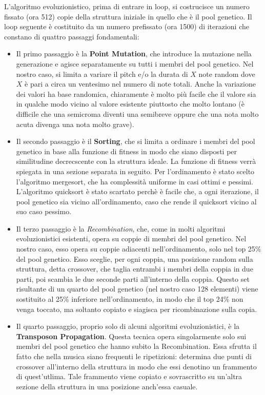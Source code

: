 L'algoritmo evoluzionistico, prima di entrare in loop, si costrucisce un numero fissato (ora 512) copie della struttura iniziale in quello che è il pool genetico.
Il loop seguente è costituito da un numero prefissato (ora 1500) di iterazioni che constano di quattro passaggi fondamentali\cite{yt:evol}:
\begin{itemize}
 \item Il primo passaggio è la \textbf{Point Mutation}, che introduce la mutazione nella generazione e agisce separatamente su tutti i membri del pool genetico.
 Nel nostro caso, si limita a variare il pitch e/o la durata di $X$ note random dove $X$ è pari a circa un ventesimo nel numero di note totali.
 Anche la variazione dei valori ha base randomica, chiaramente è molto più facile che il valore sia in qualche modo vicino al valore esistente piuttosto che molto lontano (è difficile che una semicroma diventi una semibreve oppure che una nota molto acuta divenga una nota molto grave).
 \item Il secondo passaggio è il \textbf{Sorting}, che si limita a ordinare i membri del pool genetico in base alla funzione di fitness in modo che siano disposti per similitudine decrecscente con la struttura ideale.
 La funzione di fitness verrà spiegata in una sezione separata in seguito.
 Per l'ordinamento è stato scelto l'algoritmo mergesort, che ha complessità uniforme in casi ottimi e pessimi.
 L'algoritmo quicksort è stato scartato perchè è facile che, a ogni iterazione, il pool genetico sia vicino all'ordinamento, caso che rende il quicksort vicino al suo caso pessimo.
 \item Il terzo passaggio è la \textit{Recombination}, che, come in molti algoritmi evoluzionistici esistenti, opera su coppie di membri del pool genetico.
 Nel nostro caso, esso opera su coppie adiacenti nell'ordinamento, solo nel top 25\% del pool genetico.
 Esso sceglie, per ogni coppia, una posizione random sulla struttura, detta crossover, che taglia entrambi i membri della coppia in due parti, poi scambia le due seconde parti all'interno della coppia.
 Questo set risultante di un quarto del pool genetico (nel nostro caso 128 elementi) viene sostituito al 25\% inferiore nell'ordinamento, in modo che il top 24\% non venga toccato, ma soltanto copiato e siagisca per ricombinazione sulla copia.
 \item Il quarto passaggio, proprio solo di alcuni algoritmi evoluzionistici, è la \textbf{Transposon Propagation}.
 Questa tecnica opera singolarmente solo sui membri del pool genetico che hanno subito la Recombination.
 Essa sfrutta il fatto che nella musica siano frequenti le ripetizioni: determina due punti di crossover all'interno della struttura in modo che essi denotino un frammento di quest'utlima.
 Tale frammento viene copiato e sovrascritto su un'altra sezione della struttura in una posizione anch'essa casuale. 
 \end{itemize}

